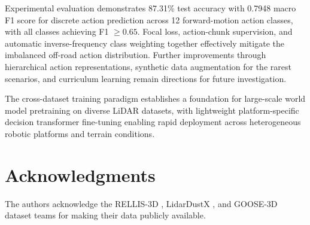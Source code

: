 \documentclass[journal]{IEEEtran}
\begin{document}
Experimental evaluation demonstrates 87.31\% test accuracy with 0.7948 macro F1 score for discrete action prediction across 12 forward-motion action classes, with all classes achieving F1 $\geq 0.65$. Focal loss, action-chunk supervision, and automatic inverse-frequency class weighting together effectively mitigate the imbalanced off-road action distribution. Further improvements through hierarchical action representations, synthetic data augmentation for the rarest scenarios, and curriculum learning remain directions for future investigation.

The cross-dataset training paradigm establishes a foundation for large-scale world model pretraining on diverse LiDAR datasets, with lightweight platform-specific decision transformer fine-tuning enabling rapid deployment across heterogeneous robotic platforms and terrain conditions.

\section*{Acknowledgments}
The authors acknowledge the RELLIS-3D \cite{jiang2021}, LidarDustX \cite{lidardust}, and GOOSE-3D \cite{goose2024} dataset teams for making their data publicly available.

\end{document}
